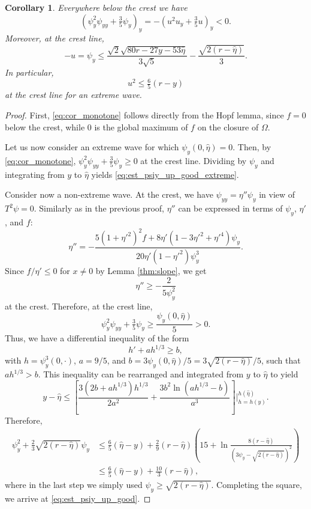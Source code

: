 \documentclass[10pt,a4paper]{amsart}
\newtheorem{corollary}{Corollary}
\begin{document}
\begin{corollary}\label{cor:u_crestline}
	Everywhere below the crest we have
	\begin{equation}\label{eq:cor_monotone}
		(\psi_y^2 \psi_{yy}+\tfrac35 \psi_y)_y = -(u^2 u_y+\tfrac35 u)_y < 0.
	\end{equation}
	Moreover, at the crest line,
	\begin{equation}\label{eq:est_psiy_up_good}
		-u = \psi_y \le \frac{\sqrt2\sqrt{80r-27y-53\hat\eta}}{3\sqrt5} - \frac{\sqrt{2(r-\hat\eta)}}{3}.
	\end{equation}
	In particular,
	\begin{equation}\label{eq:est_psiy_up_good_extreme}
		u^2 \leq \tfrac65 (r-y)
	\end{equation}
	at the crest line for an extreme wave.
\end{corollary}

\begin{proof}
	First, \eqref{eq:cor_monotone} follows directly from the Hopf lemma, since $f = 0$ below the crest, while $0$ is the global maximum of $f$ on the closure of $\Omega$.
	
	Let us now consider an extreme wave for which $\psi_y(0,\hat\eta)=0$. Then, by \eqref{eq:cor_monotone}, $\psi_y^2 \psi_{yy}+\tfrac35 \psi_y\ge0$ at the crest line. Dividing by $\psi_y$ and integrating from $y$ to $\hat\eta$ yields \eqref{eq:est_psiy_up_good_extreme}.
	
	Consider now a non-extreme wave. At the crest, we have $\psi_{yy}=\eta''\psi_y$ in view of $T^2\psi=0$. Similarly as in the previous proof, $\eta''$ can be expressed in terms of $\psi_y$, $\eta'$, and $f$:
	\[\eta'' = -\frac{5(1+\eta'^2)^2 f + 8\eta' (1-3\eta'^2+\eta'^4)\psi_y}{20\eta' (1-\eta'^2) \psi_y^3}.\]
	Since $f/\eta'\le0$ for $x\ne0$ by Lemma \ref{thm:slope}, we get
	\[\eta'' \ge -\frac{2}{5\psi_y^2}\]
	at the crest. Therefore, at the crest line,
	\[\psi_y^2 \psi_{yy}+\tfrac35 \psi_y \ge \frac{\psi_y(0,\hat\eta)}{5} > 0.\]
	Thus, we have a differential inequality of the form
	\[h' + ah^{1/3} \ge b,\]
	with $h=\psi_y^3(0,\cdot)$, $a=9/5$, and $b=3\psi_y(0,\hat\eta)/5=3\sqrt{2(r-\hat\eta)}/5$, such that $ah^{1/3}>b$. This inequality can be rearranged and integrated from $y$ to $\hat\eta$ to yield
	\[y-\hat\eta \le \left[\frac{3(2b+ah^{1/3})h^{1/3}}{2a^2} + \frac{3b^2\ln(ah^{1/3}-b)}{a^3}\right]\Bigg|_{h=h(y)}^{h(\hat\eta)}.\]
	Therefore,
	\begin{align*}
		\psi_y^2 + \tfrac23 \sqrt{2(r-\hat\eta)}\psi_y &\le \tfrac65 (\hat\eta-y) + \tfrac29 (r-\hat\eta) \left(15 + \ln\frac{8(r-\hat\eta)}{\left(3\psi_y-\sqrt{2(r-\hat\eta)}\right)^2}\right)\\
		&\le \tfrac65 (\hat\eta-y) + \tfrac{10}{3} (r-\hat\eta),
	\end{align*}
	where in the last step we simply used $\psi_y\ge\sqrt{2(r-\hat\eta)}$. Completing the square, we arrive at \eqref{eq:est_psiy_up_good}.
\end{proof}
\end{document}
